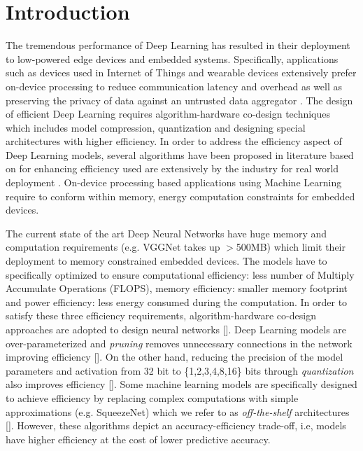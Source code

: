 \section{Introduction}\label{introduction}

The tremendous performance of Deep Learning has resulted in their deployment to low-powered edge devices and embedded systems.
Specifically, applications such as devices used in Internet of Things and wearable devices extensively prefer on-device processing to reduce communication latency and overhead as well as preserving the privacy of data against an untrusted data aggregator \cite{8110880}.
The design of efficient Deep Learning requires algorithm-hardware co-design techniques which includes model compression, quantization and designing special architectures with higher efficiency.
In order to address the efficiency aspect of Deep Learning models, several algorithms have been proposed in literature based on  for enhancing efficiency used are extensively by the industry for real world deployment \cite{8114708}.
On-device processing based applications using Machine Learning require to conform within memory, energy computation constraints for embedded devices.

The current state of the art Deep Neural Networks have huge memory and computation requirements (e.g. VGGNet takes up $>$500MB) which limit their deployment to memory constrained embedded devices.
The models have to specifically optimized to ensure computational efficiency: less number of Multiply Accumulate Operations (FLOPS), memory efficiency: smaller memory footprint and power efficiency: less energy consumed during the computation.
In order to satisfy these three efficiency requirements,  algorithm-hardware co-design approaches are adopted to design neural networks [].
Deep Learning models are over-parameterized and \textit{pruning} removes unnecessary connections in the network improving efficiency [].
On the other hand, reducing the precision of the model parameters and activation from 32 bit to \{1,2,3,4,8,16\} bits through \textit{quantization} also improves efficiency [].
Some machine learning models are specifically designed to achieve efficiency by replacing complex computations with simple approximations (e.g. SqueezeNet) which we refer to as \textit{off-the-shelf} architectures [].
However, these algorithms depict an accuracy-efficiency trade-off, i.e, models have higher efficiency at the cost of lower predictive accuracy.


